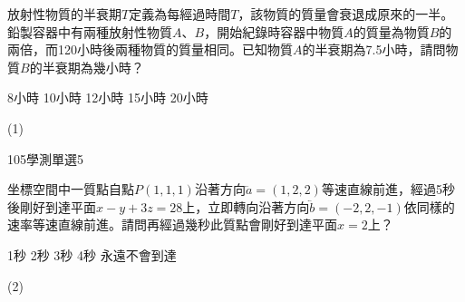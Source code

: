 \begin{QUESTIONS}
\begin{QUESTION}
        \begin{QBODY}
            放射性物質的半衰期$T$定義為每經過時間$T$，該物質的質量會衰退成原來的一半。鉛製容器中有兩種放射性物質$A$、$B$，開始紀錄時容器中物質$A$的質量為物質$B$的兩倍，而120小時後兩種物質的質量相同。已知物質$A$的半衰期為7.5小時，請問物質$B$的半衰期為幾小時？
			\begin{QOPS}
				\QOP 8小時	
				\QOP 10小時	
				\QOP 12小時	
				\QOP 15小時	
				\QOP 20小時
			\end{QOPS}
        \end{QBODY}
        \begin{QFROMS}
        \end{QFROMS}
        \begin{QTAGS}\end{QTAGS}
        \begin{QANS}
            (1)
        \end{QANS}
        \begin{QSOLLIST}
        \end{QSOLLIST}
        \begin{QEMPTYSPACE}
        \end{QEMPTYSPACE}
    \end{QUESTION}
    \begin{QUESTION}
        \begin{ExamInfo}{105}{學測}{單選}{5}
        \end{ExamInfo}
        \begin{ExamAnsRateInfo}{52}{86}{49}{21}
        \end{ExamAnsRateInfo}
        \begin{QBODY}
            坐標空間中一質點自點$P(1,1,1)$沿著方向$\lvec{a}=(1,2,2)$等速直線前進，經過5秒後剛好到達平面$x-y+3z=28$上，立即轉向沿著方向$\lvec{b}=(-2,2,-1)$依同樣的速率等速直線前進。請問再經過幾秒此質點會剛好到達平面$x=2$上？
			\begin{QOPS}
				\QOP 1秒
				\QOP 2秒
				\QOP 3秒
				\QOP 4秒
				\QOP 永遠不會到達
			\end{QOPS}
        \end{QBODY}
        \begin{QFROMS}
        \end{QFROMS}
        \begin{QTAGS}\end{QTAGS}
        \begin{QANS}
            (2)
        \end{QANS}

\end{QUESTION}
\end{QUESTIONS}
